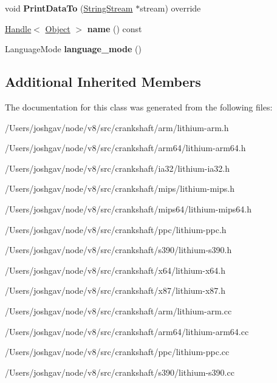 \begin{DoxyCompactItemize}
\item 
void {\bfseries Print\+Data\+To} (\hyperlink{classv8_1_1internal_1_1_string_stream}{String\+Stream} $\ast$stream) override\hypertarget{classv8_1_1internal_1_1_l_store_named_generic_a71e5fdb3cd3c873fcaace82fa3a0291b}{}\label{classv8_1_1internal_1_1_l_store_named_generic_a71e5fdb3cd3c873fcaace82fa3a0291b}

\item 
\hyperlink{classv8_1_1internal_1_1_handle}{Handle}$<$ \hyperlink{classv8_1_1internal_1_1_object}{Object} $>$ {\bfseries name} () const \hypertarget{classv8_1_1internal_1_1_l_store_named_generic_a0fcb3f4bcaad0355374c20f5f3d215ab}{}\label{classv8_1_1internal_1_1_l_store_named_generic_a0fcb3f4bcaad0355374c20f5f3d215ab}

\item 
Language\+Mode {\bfseries language\+\_\+mode} ()\hypertarget{classv8_1_1internal_1_1_l_store_named_generic_a9aaa8911322a00bb960fa5f3e132ee3c}{}\label{classv8_1_1internal_1_1_l_store_named_generic_a9aaa8911322a00bb960fa5f3e132ee3c}

\end{DoxyCompactItemize}
\subsection*{Additional Inherited Members}


The documentation for this class was generated from the following files\+:\begin{DoxyCompactItemize}
\item 
/\+Users/joshgav/node/v8/src/crankshaft/arm/lithium-\/arm.\+h\item 
/\+Users/joshgav/node/v8/src/crankshaft/arm64/lithium-\/arm64.\+h\item 
/\+Users/joshgav/node/v8/src/crankshaft/ia32/lithium-\/ia32.\+h\item 
/\+Users/joshgav/node/v8/src/crankshaft/mips/lithium-\/mips.\+h\item 
/\+Users/joshgav/node/v8/src/crankshaft/mips64/lithium-\/mips64.\+h\item 
/\+Users/joshgav/node/v8/src/crankshaft/ppc/lithium-\/ppc.\+h\item 
/\+Users/joshgav/node/v8/src/crankshaft/s390/lithium-\/s390.\+h\item 
/\+Users/joshgav/node/v8/src/crankshaft/x64/lithium-\/x64.\+h\item 
/\+Users/joshgav/node/v8/src/crankshaft/x87/lithium-\/x87.\+h\item 
/\+Users/joshgav/node/v8/src/crankshaft/arm/lithium-\/arm.\+cc\item 
/\+Users/joshgav/node/v8/src/crankshaft/arm64/lithium-\/arm64.\+cc\item 
/\+Users/joshgav/node/v8/src/crankshaft/ppc/lithium-\/ppc.\+cc\item 
/\+Users/joshgav/node/v8/src/crankshaft/s390/lithium-\/s390.\+cc\end{DoxyCompactItemize}
